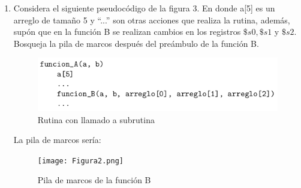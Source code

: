 \documentclass{article}
\begin{document}
\begin{enumerate}
{\begin{enumerate}
{			El tamaño mínimo que puede tener un marco para una subrutina nodo es el tamaño del marco original, que sería de 32 bytes.\\
			
			}
		\end{enumerate}
		
	
	}
	
		
	\item{
	Considera el siguiente pseudocódigo de la figura 3. En donde a[5] es un
	arreglo de tamaño 5 y “...” son otras acciones que realiza la rutina, además, supón que en la función B se realizan cambios en los registros $\$s0, \$s1$
	y $\$s2$. Bosqueja la pila de marcos después del preámbulo de la función B.\\
	
	\begin{figure}[H]
		\centering
		\includegraphics[scale=0.5]{Figura1.png}
		\caption{Rutina con llamado a subrutina}
	\end{figure}


	La pila de marcos sería:\\
	
	\begin{figure}[H]
		\centering
		\texttt{[image: Figura2.png]}
		\caption{Pila de marcos de la función B}
	\end{figure}
	
	}
        
    \end{enumerate}


    \begin{thebibliography}{1}
       
    \end{thebibliography}
\end{document}

